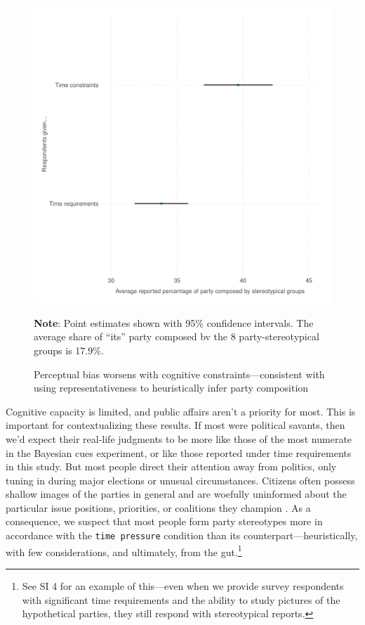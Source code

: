 \documentclass[12pt, letterpaper]{article}
\begin{document}
\begin{figure}
\caption{Perceptual bias worsens with cognitive constraints---consistent with using representativeness to heuristically infer party composition}
\label{fig:timing}
\begin{center}
\includegraphics[width=1\textwidth]{../figs/fig_5_timing.pdf}
\end{center}
\scriptsize{\textbf{Note}: Point estimates shown with 95\% confidence intervals. The average share of ``its'' party composed bv the 8 party-stereotypical groups is 17.9\%.}
\end{figure}

Cognitive capacity is limited, and public affairs aren't a priority for most. This is important for contextualizing these results. If most were political savants, then we'd expect their real-life judgments to be more like those of the most numerate in the Bayesian cues experiment, or like those reported under time requirements in this study. But most people direct their attention away from politics, only tuning in during major elections or unusual circumstances. Citizens often possess shallow images of the parties in general \citep{BullockEtAl2015, Converse1964, dancey2016inferences, DelliCarpiniKeeter1995, KuklinskiEtAl2000} and are woefully uninformed about the particular issue positions, priorities, or coalitions they champion \citep{Levendusky2010, Zaller1992}. As a consequence, we suspect that most people form party stereotypes more in accordance with the {\tt time pressure} condition than its counterpart---heuristically, with few considerations, and ultimately, from the gut.\footnote{See SI 4 for an example of this---even when we provide survey respondents with significant time requirements and the ability to study pictures of the hypothetical parties, they still respond with stereotypical reports.}
\end{document}
